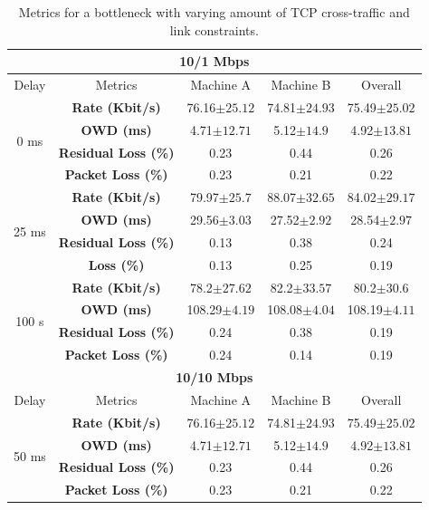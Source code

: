 \begin{table}[h]
\begin{center}
\begin{tabular}{ |c|c|c|c|c| }
\hline
\multicolumn{5}{|c|}{\textbf{10/1 Mbps}} \\ \hline
 Delay & Metrics & Machine A & Machine B & Overall\\ \hline
\multirow{4}{*}{0 ms} & \textbf{Rate (Kbit/s)} & 76.16$\pm25.12$ & 74.81$\pm24.93$ & 75.49$\pm25.02$\\ \cline{2-5}
 & \textbf{OWD (ms)} &  4.71$\pm12.71$ & 5.12$\pm14.9$ & 4.92$\pm13.81$ \\ \cline{2-5}
 & \textbf{Residual Loss (\%)} & 0.23 & 0.44 & 0.26 \\ \cline{2-5}
 & \textbf{Packet Loss (\%)} & 0.23 & 0.21 & 0.22 \\ \hline
\multirow{4}{*}{25 ms} & \textbf{Rate (Kbit/s)} & 79.97$\pm25.7$ & 88.07$\pm32.65$ & 84.02$\pm29.17$\\ \cline{2-5}
 & \textbf{OWD (ms)} & 29.56$\pm3.03$ & 27.52$\pm2.92$ & 28.54$\pm2.97$ \\ \cline{2-5}
 & \textbf{Residual Loss (\%)} & 0.13 & 0.38 & 0.24 \\ \cline{2-5}
 & \textbf{Loss (\%)} & 0.13 & 0.25 & 0.19 \\ \hline
\multirow{4}{*}{100 s} & \textbf{Rate (Kbit/s)} & 78.2$\pm27.62$ & 82.2$\pm33.57$ & 80.2$\pm30.6$\\ \cline{2-5}
 & \textbf{OWD (ms)} & 108.29$\pm4.19$ & 108.08$\pm4.04$ & 108.19$\pm4.11$ \\ \cline{2-5}
 & \textbf{Residual Loss (\%)} & 0.24 & 0.38 & 0.19 \\ \cline{2-5}
 & \textbf{Packet Loss (\%)} & 0.24 & 0.14 & 0.19  \\ \hline
\multicolumn{5}{|c|}{\textbf{10/10 Mbps}} \\ \hline
 Delay & Metrics & Machine A & Machine B & Overall\\ \hline
\multirow{4}{*}{50 ms} & \textbf{Rate (Kbit/s)} & 76.16$\pm25.12$ & 74.81$\pm24.93$ & 75.49$\pm25.02$\\ \cline{2-5}
 & \textbf{OWD (ms)} &  4.71$\pm12.71$ & 5.12$\pm14.9$ & 4.92$\pm13.81$ \\ \cline{2-5}
 & \textbf{Residual Loss (\%)} & 0.23 & 0.44 & 0.26 \\ \cline{2-5}
 & \textbf{Packet Loss (\%)} & 0.23 & 0.21 & 0.22 \\ \hline
\end{tabular}
    \caption[Metrics for a bottleneck with varying amount of TCP cross-traffic and link constraints]{Metrics for a bottleneck with varying amount of TCP cross-traffic and link constraints.}
    \label{fig:iperf_tests}
\end{center}
\end{table}

